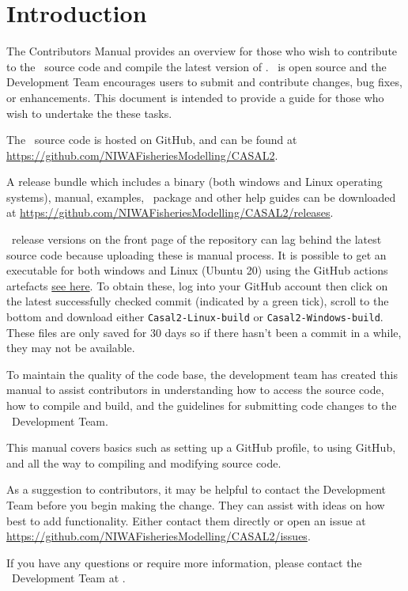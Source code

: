 \section{Introduction\label{sec:Introduction}}

The Contributors Manual provides an overview for those who wish to contribute to the \CNAME\ source code and compile the latest version of \CNAME. \CNAME\ is open source and the Development Team encourages users to submit and contribute changes, bug fixes, or enhancements. This document is intended to provide a guide for those who wish to undertake the these tasks. 

The \CNAME\ source code is hosted on GitHub, and can be found at \url{https://github.com/NIWAFisheriesModelling/CASAL2}.

A release bundle which includes a binary (both windows and Linux operating systems), manual, examples, \R\  package and other help guides can be downloaded at \url{https://github.com/NIWAFisheriesModelling/CASAL2/releases}. 

\CNAME\ release versions on the front page of the repository can lag behind the latest source code because uploading these is manual process. It is possible to get an executable for both windows and Linux (Ubuntu 20) using the GitHub actions artefacts \href{https://github.com/NIWAFisheriesModelling/CASAL2/actions}{see here}. To obtain these, log into your GitHub account then click on the latest successfully checked commit (indicated by a green tick), scroll to the bottom and download either \texttt{Casal2-Linux-build} or \texttt{Casal2-Windows-build}. These files are only saved for 30 days so if there hasn't been a commit in a while, they may not be available.

To maintain the quality of the code base, the development team has created this manual to assist contributors in understanding how to access the source code, how to compile and build, and the guidelines for submitting code changes to the \CNAME\ Development Team.  

This manual covers basics such as setting up a GitHub profile, to using GitHub, and all the way to compiling and modifying source code. 

As a suggestion to contributors, it may be helpful to contact the Development Team before you begin making the change. They can assist with ideas on how best to add functionality. Either contact them directly or open an issue at \url{https://github.com/NIWAFisheriesModelling/CASAL2/issues}. 

If you have any questions or require more information, please contact the \CNAME\ Development Team at \email.